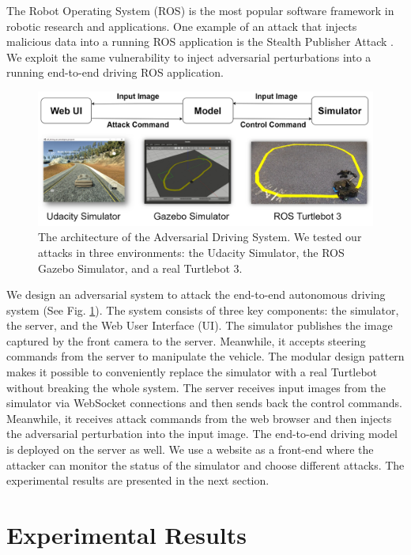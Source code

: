 The Robot Operating System (ROS) \citep{ros} is the most popular software framework in robotic research and applications. One example of an attack that
injects malicious data into a running ROS application is the Stealth Publisher Attack \citep{dieber2020penetration}. We exploit the same vulnerability to inject adversarial perturbations into a running end-to-end driving ROS application.

\begin{figure}[H]
    \centering
    \includegraphics[width=\textwidth]{figures/chapter_driving/architechture.jpg}
    \caption{The architecture of the Adversarial Driving System. We tested our attacks in three environments: the Udacity Simulator, the ROS Gazebo Simulator, and a real Turtlebot 3.}
    \label{fig:arch}
\end{figure}

We design an adversarial system to attack the end-to-end autonomous driving system (See Fig. \ref{fig:arch}). The system consists of three key components: the simulator, the server, and the Web User Interface (UI). The simulator publishes the image captured by the front camera to the server. Meanwhile, it accepts steering commands from the server to manipulate the vehicle. The modular design pattern makes it possible to conveniently replace the simulator with a real Turtlebot without breaking the whole system. The server receives input images from the simulator via WebSocket connections and then sends back the control commands. Meanwhile, it receives attack commands from the web browser and then injects the adversarial perturbation into the input image. The end-to-end driving model is deployed on the server as well. We use a website as a front-end where the attacker can monitor the status of the simulator and choose different attacks.
The experimental results are presented in the next section.




\section{Experimental Results}

